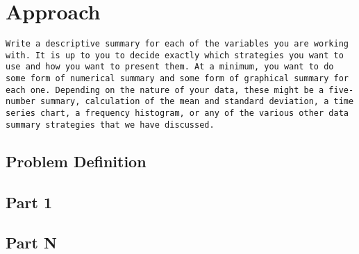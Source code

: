 \chapter{Approach}\label{chap:approach}



\begin{verbatim}
Write a descriptive summary for each of the variables you are working with. It is up to you to decide exactly which strategies you want to use and how you want to present them. At a minimum, you want to do some form of numerical summary and some form of graphical summary for each one. Depending on the nature of your data, these might be a five-number summary, calculation of the mean and standard deviation, a time series chart, a frequency histogram, or any of the various other data summary strategies that we have discussed.
\end{verbatim}

\section{Problem Definition}

\section{Part 1}

\section{Part N}